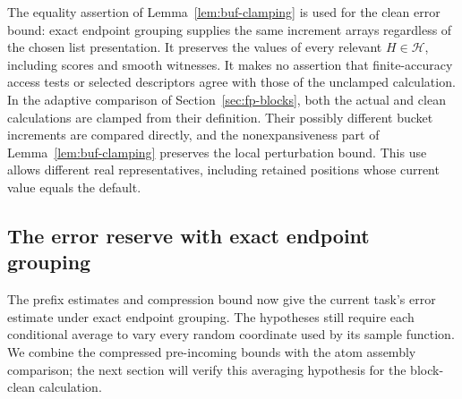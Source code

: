 The equality assertion of Lemma~\ref{lem:buf-clamping} is used for the
clean error bound: exact endpoint grouping supplies the same increment
arrays regardless of the chosen list presentation.  It preserves the
values of every relevant $H\in\mathcal H$, including scores and smooth
witnesses.  It makes no assertion that finite-accuracy access tests or
selected descriptors agree with those of the unclamped calculation.
In the adaptive comparison of Section~\ref{sec:fp-blocks}, both the actual
and clean calculations are clamped from their definition.  Their
possibly different bucket increments are compared directly, and the
nonexpansiveness part of Lemma~\ref{lem:buf-clamping} preserves the local
perturbation bound.  This use allows different real representatives,
including retained positions whose current value equals the default.

\subsection{The error reserve with exact endpoint grouping}

The prefix estimates and compression bound now give the current task's
error estimate under exact endpoint grouping.  The hypotheses still
require each conditional average to vary every random coordinate used
by its sample function.  We combine the compressed pre-incoming bounds
with the atom assembly comparison; the next section will verify this
averaging hypothesis for the block-clean calculation.

